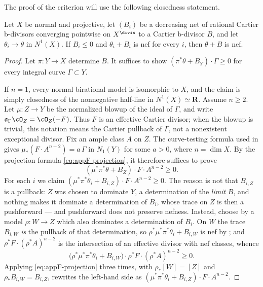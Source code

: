 The proof of the criterion will use the following closedness statement.

\begin{lemma}
\label{lem:ch35-nef-limit}
Let $X$ be normal and projective, let $(B_i)$ be a decreasing net of
rational Cartier b-divisors converging pointwise on $X^{\divis}$ to a
Cartier b-divisor $B$, and let $\theta_i\to\theta$ in $N^1(X)$.  If
$B_i\leq0$ and $\theta_i+B_i$ is nef for every $i$, then
$\theta+B$ is nef.
\end{lemma}

\begin{proof}
Let $\pi:Y\to X$ determine $B$.  It suffices to show
$(\pi^*\theta+B_Y)\cdot\Gamma\geq0$ for every integral curve
$\Gamma\subset Y$.

If $n=1$, every normal birational model is isomorphic to $X$, and the
claim is simply closedness of the nonnegative half-line in
$N^1(X)\simeq\mathbf R$.  Assume $n\geq2$.  Let $\mu:Z\to Y$ be the
normalized blowup of the ideal of $\Gamma$, and write
$\mathfrak a_\Gamma\cO_Z=\cO_Z(-F)$.  Thus $F$ is an effective Cartier
divisor; when the blowup is trivial, this notation means the Cartier
pullback of $\Gamma$, not a nonexistent exceptional divisor.  Fix an
ample class $A$ on $Z$.  The curve-testing formula used in
\cite[Lemma~6.37]{BJ22} gives
$\mu_*(F\cdot A^{n-2})=a\,\Gamma$ in $N_1(Y)$ for some $a>0$, where
$n=\dim X$.  By the projection formula
\eqref{eq:appF-projection}, it therefore suffices to prove
\[
 (\mu^*\pi^*\theta+B_Z)\cdot F\cdot A^{n-2}\geq0 .
\]
For each $i$ we claim
$(\mu^*\pi^*\theta_i+B_{i,Z})\cdot F\cdot A^{n-2}\geq0$.  The reason is not
that $B_{i,Z}$ is a pullback: $Z$ was chosen to dominate $Y$, a
determination of the \emph{limit} $B$, and nothing makes it dominate a
determination of $B_i$, whose trace on $Z$ is then a pushforward --- and
pushforward does not preserve nefness.  Instead, choose by
 a model $\rho:W\to Z$ which also
dominates a determination of $B_i$.  On $W$ the trace $B_{i,W}$
\emph{is} the pullback of that determination, so
$\rho^*\mu^*\pi^*\theta_i+B_{i,W}$ is nef by
; and $\rho^*F\cdot(\rho^*A)^{n-2}$ is the
intersection of an effective divisor with nef classes, whence
\[
 \bigl(\rho^*\mu^*\pi^*\theta_i+B_{i,W}\bigr)\cdot\rho^*F\cdot
 (\rho^*A)^{n-2}\geq0 .
\]
Applying \eqref{eq:appF-projection} three times, with $\rho_*[W]=[Z]$ and
$\rho_*B_{i,W}=B_{i,Z}$, rewrites the left-hand side as
$(\mu^*\pi^*\theta_i+B_{i,Z})\cdot F\cdot A^{n-2}$.


\end{proof}
